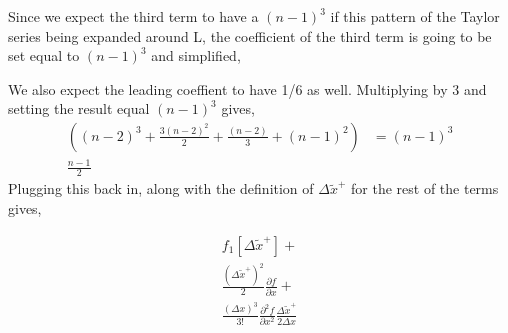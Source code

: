 \documentclass[12pt]{article}
\begin{document}
Since we expect the third term to have a $\left( n-1 \right)^3$ if this pattern
of the Taylor series being expanded around L, the coefficient of the third term
is going to be set equal to $\left( n-1 \right)^3$ and simplified,

We also expect the leading coeffient to have 1/6 as well. Multiplying by 3
and setting the result equal $(n-1)^3$ gives,
\begin{align*}
    \left(
    (n-2)^3 + \frac{3(n-2)^2}{2} + \frac{(n-2)}{3} + (n-1)^2 
    \right)
    &=
    (n-1)^3 \\
    \frac{n-1}{2}
\end{align*}
Plugging this back in, along with the definition of $\Delta \widetilde{x}^+$ for
the rest of the terms gives,


\begin{align*}
     f_1\left[ \Delta \widetilde{x}^+  \right] + \\
 \frac{(\Delta \widetilde{x}^+)^2}{2}     \frac{\partial f}{\partial x }  + \\
 \frac{(\Delta x)^3}{3!} \frac{\partial^2 f}{\partial x^2 } 
 \frac{ \Delta \widetilde{x}^+
 }{2\Delta x}
 \end{align*}
\end{document}
